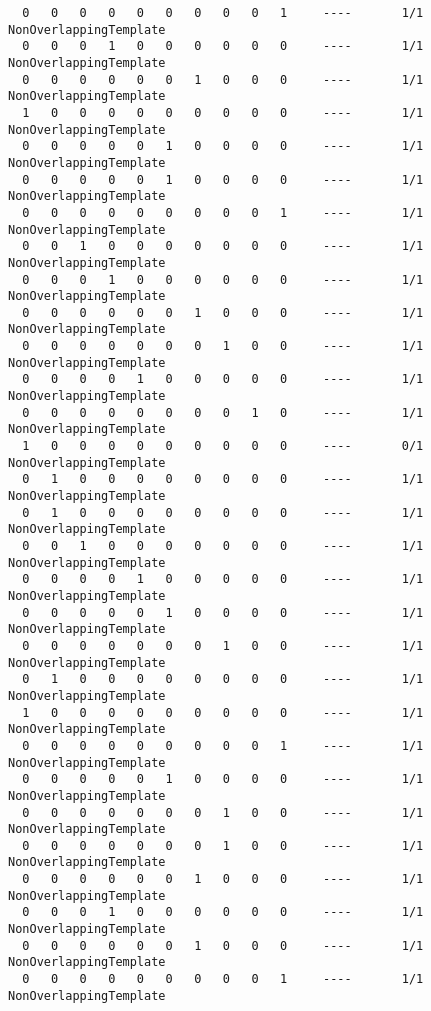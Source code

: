 \begin{code}
\begin{verbatim}
  0   0   0   0   0   0   0   0   0   1     ----       1/1       NonOverlappingTemplate
  0   0   0   1   0   0   0   0   0   0     ----       1/1       NonOverlappingTemplate
  0   0   0   0   0   0   1   0   0   0     ----       1/1       NonOverlappingTemplate
  1   0   0   0   0   0   0   0   0   0     ----       1/1       NonOverlappingTemplate
  0   0   0   0   0   1   0   0   0   0     ----       1/1       NonOverlappingTemplate
  0   0   0   0   0   1   0   0   0   0     ----       1/1       NonOverlappingTemplate
  0   0   0   0   0   0   0   0   0   1     ----       1/1       NonOverlappingTemplate
  0   0   1   0   0   0   0   0   0   0     ----       1/1       NonOverlappingTemplate
  0   0   0   1   0   0   0   0   0   0     ----       1/1       NonOverlappingTemplate
  0   0   0   0   0   0   1   0   0   0     ----       1/1       NonOverlappingTemplate
  0   0   0   0   0   0   0   1   0   0     ----       1/1       NonOverlappingTemplate
  0   0   0   0   1   0   0   0   0   0     ----       1/1       NonOverlappingTemplate
  0   0   0   0   0   0   0   0   1   0     ----       1/1       NonOverlappingTemplate
  1   0   0   0   0   0   0   0   0   0     ----       0/1       NonOverlappingTemplate
  0   1   0   0   0   0   0   0   0   0     ----       1/1       NonOverlappingTemplate
  0   1   0   0   0   0   0   0   0   0     ----       1/1       NonOverlappingTemplate
  0   0   1   0   0   0   0   0   0   0     ----       1/1       NonOverlappingTemplate
  0   0   0   0   1   0   0   0   0   0     ----       1/1       NonOverlappingTemplate
  0   0   0   0   0   1   0   0   0   0     ----       1/1       NonOverlappingTemplate
  0   0   0   0   0   0   0   1   0   0     ----       1/1       NonOverlappingTemplate
  0   1   0   0   0   0   0   0   0   0     ----       1/1       NonOverlappingTemplate
  1   0   0   0   0   0   0   0   0   0     ----       1/1       NonOverlappingTemplate
  0   0   0   0   0   0   0   0   0   1     ----       1/1       NonOverlappingTemplate
  0   0   0   0   0   1   0   0   0   0     ----       1/1       NonOverlappingTemplate
  0   0   0   0   0   0   0   1   0   0     ----       1/1       NonOverlappingTemplate
  0   0   0   0   0   0   0   1   0   0     ----       1/1       NonOverlappingTemplate
  0   0   0   0   0   0   1   0   0   0     ----       1/1       NonOverlappingTemplate
  0   0   0   1   0   0   0   0   0   0     ----       1/1       NonOverlappingTemplate
  0   0   0   0   0   0   1   0   0   0     ----       1/1       NonOverlappingTemplate
  0   0   0   0   0   0   0   0   0   1     ----       1/1       NonOverlappingTemplate

\end{verbatim}
\end{code}
